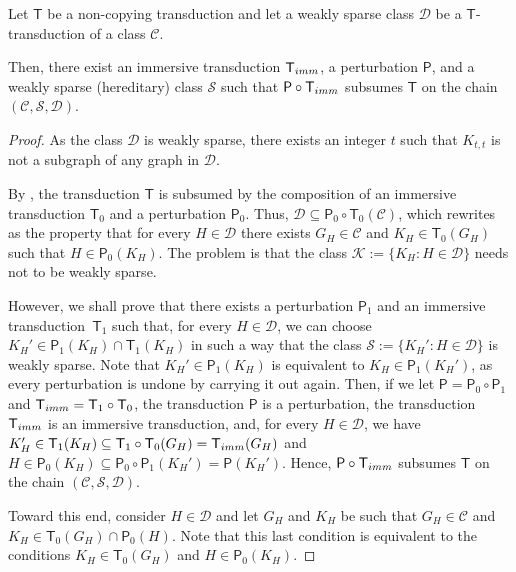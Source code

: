 \documentclass{lmcs}
\newcommand{\Cc}{\mathscr{C}}
\newcommand{\Dd}{\mathscr{D}}
\newcommand{\Ss}{\mathscr{S}}
\theoremstyle{definition}
\begin{document}
\begin{thm}
	\label{thm:rel-normal}
	Let  $\mathsf T$ be a non-copying transduction and let a  weakly sparse  class $\Dd$ be a $\mathsf T$-transduction  of a class $\Cc$.
	
	Then, there exist an immersive transduction $\mathsf T_{\rm imm}$, a perturbation $\mathsf P$, and a weakly sparse (hereditary)  class $\Ss$ such that 
	$\mathsf P\circ\mathsf T_{\rm imm}$ subsumes $\mathsf T$ on the chain $(\Cc,\Ss,\Dd)$.
\end{thm}
\begin{proof}
	As the class $\Dd$ is weakly sparse, there exists an integer $t$ such that $K_{t,t}$ is not a subgraph of any graph in $\Dd$.
	
	By , the transduction $\mathsf T$ is subsumed by the composition of an immersive transduction $\mathsf T_0$ and a perturbation $\mathsf P_0$.
	Thus, $\Dd\subseteq \mathsf P_0\circ\mathsf T_0(\Cc)$, which rewrites as the property that for every $H\in\Dd$ there exists $G_H\in\Cc$ and $K_H\in\mathsf T_0(G_H)$ such that
	$H\in \mathsf P_0(K_H)$. 
	The problem is that the class $\mathscr K:=\{K_H\colon H\in\Dd\}$ needs not to be weakly sparse.
	
	However, we shall prove that there exists a perturbation $\mathsf P_1$ and an immersive transduction~$\mathsf T_1$ such that, for every $H\in\Dd$, we can choose 
	$K_H'\in\mathsf P_1(K_H)\cap \mathsf T_1(K_H)$ in such a way that the class 
	$\Ss:=\{K_H'\colon H\in\Dd\}$ is weakly sparse.
	Note that $K_H'\in\mathsf P_1(K_H)$ is equivalent to $K_H\in\mathsf P_1(K_H')$, as every perturbation is undone by carrying it out again.
	Then, if we let $\mathsf P=\mathsf P_0\circ\mathsf P_1$ and $\mathsf T_{\rm imm}=\mathsf T_1\circ\mathsf T_0$, the transduction $\mathsf P$ is a perturbation, 
	the transduction $\mathsf T_{\rm imm}$ is an immersive transduction, and, for every $H\in\Dd$, we have
	$K_H'\in \mathsf T_1(K_H)\subseteq \mathsf T_1\circ\mathsf T_0(G_H)=\mathsf T_{\rm imm}(G_H)$ and
	$H\in \mathsf P_0(K_H)\subseteq \mathsf P_0\circ\mathsf P_1(K_H')=\mathsf P(K_H')$.
	Hence, $\mathsf P\circ\mathsf T_{\rm imm}$ subsumes $\mathsf T$ on the chain $(\Cc,\Ss,\Dd)$.
	
	Toward this end, consider  $H\in\Dd$ and let $G_H$ and $K_H$ be such that $G_H\in\Cc$ and 
	$K_H\in\mathsf{T}_0(G_H)\cap\mathsf P_0(H)$.
	Note that this last condition is equivalent to the conditions  
	$K_H\in\mathsf T_0(G_H)$ and $H\in\mathsf P_0(K_H)$.
	

\end{proof}
\end{document}
